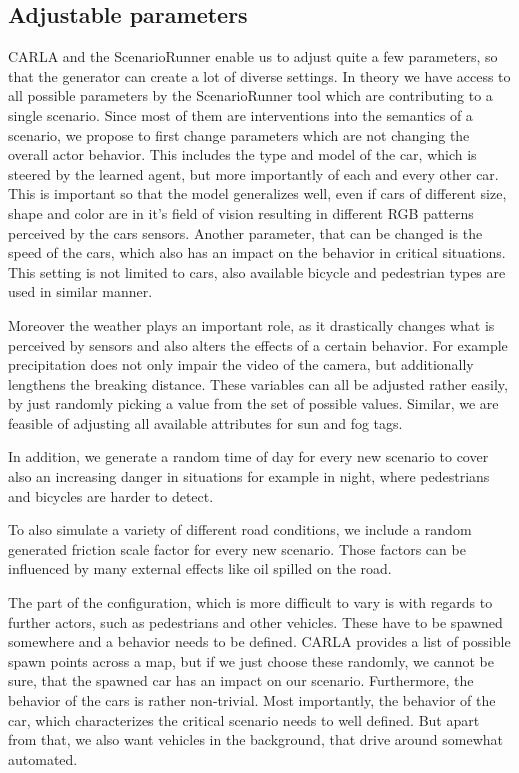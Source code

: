 \documentclass[conference, 11pt]{IEEEtran}
\begin{document}
\subsection{Adjustable parameters}

CARLA and the ScenarioRunner enable us to adjust quite a few parameters, so that the generator can create a lot of diverse settings. In theory we have access to all possible parameters by the ScenarioRunner tool which are contributing to a single scenario. Since most of them are interventions into the semantics of a scenario, we propose to first change parameters which are not changing the overall actor behavior.
This includes the type and model of the car, which is steered by the learned agent, but more importantly of each and every other car.
This is important so that the model generalizes well, even if cars of different size, shape and color are in it's field of vision resulting in different RGB patterns perceived by the cars sensors.
Another parameter, that can be changed is the speed of the cars, which also has an impact on the behavior in critical situations.
This setting is not limited to cars, also available bicycle and pedestrian types are used in similar manner.

Moreover the weather plays an important role, as it drastically changes what is perceived by sensors and also alters the effects of a certain behavior. For example precipitation does not only impair the video of the camera, but additionally lengthens the breaking distance.
These variables can all be adjusted rather easily, by just randomly picking a value from the set of possible values.
Similar, we are feasible of adjusting all available attributes for sun and fog tags.

In addition, we generate a random time of day for every new scenario to cover also an increasing danger in situations for example in night, where pedestrians and bicycles are harder to detect.

To also simulate a variety of different road conditions, we include a random generated friction scale factor for every new scenario. Those factors can be influenced by many external effects like oil spilled on the road.

The part of the configuration, which is more difficult to vary is with regards to further actors, such as pedestrians and other vehicles.
These have to be spawned somewhere and a behavior needs to be defined.
CARLA provides a list of possible spawn points across a map, but if we just choose these randomly, we cannot be sure, that the spawned car has an impact on our scenario.
Furthermore, the behavior of the cars is rather non-trivial.
Most importantly, the behavior of the car, which characterizes the critical scenario needs to well defined.
But apart from that, we also want vehicles in the background, that drive around somewhat automated.
\end{document}
